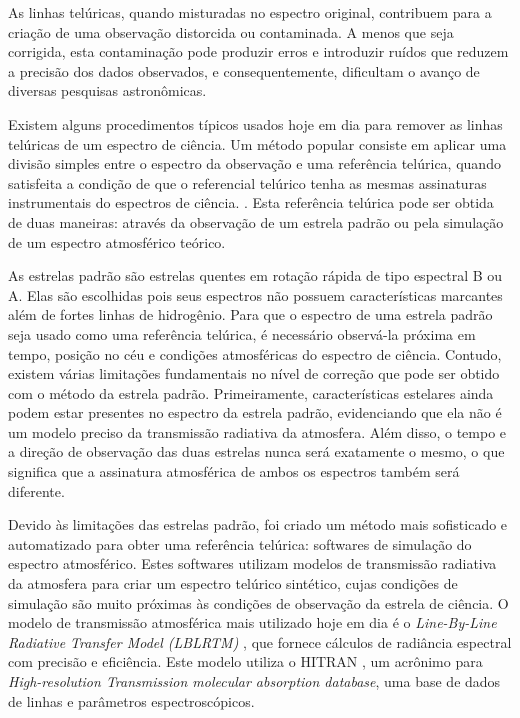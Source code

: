 As linhas telúricas, quando misturadas no espectro original, contribuem para a criação de uma observação distorcida ou contaminada. A menos que seja corrigida, esta contaminação pode produzir erros e introduzir ruídos que reduzem a precisão dos dados observados, e consequentemente, dificultam o avanço de diversas pesquisas astronômicas.

Existem alguns procedimentos típicos usados hoje em dia para remover as linhas telúricas de um espectro de ciência. Um método popular consiste em aplicar uma divisão simples entre o espectro da observação e uma referência telúrica, quando satisfeita a condição de que o referencial telúrico tenha as mesmas assinaturas instrumentais do espectros de ciência. . Esta referência telúrica pode ser obtida de duas maneiras: através da observação de um estrela padrão ou pela simulação de um espectro atmosférico teórico.

As estrelas padrão são estrelas quentes em rotação rápida de tipo espectral B ou A. Elas são escolhidas pois seus espectros não possuem características marcantes além de fortes linhas de hidrogênio. Para que o espectro de uma estrela padrão seja usado como uma referência telúrica, é necessário observá-la próxima em tempo, posição no céu e condições atmosféricas do espectro de ciência. Contudo, existem várias limitações fundamentais no nível de correção que pode ser obtido com o método da estrela padrão. Primeiramente, características estelares ainda podem estar presentes no espectro da estrela padrão, evidenciando que ela não é um modelo preciso da transmissão radiativa da atmosfera. Além disso, o tempo e a direção de observação das duas estrelas nunca será exatamente o mesmo, o que significa que a assinatura atmosférica de ambos os espectros também será diferente.

Devido às limitações das estrelas padrão, foi criado um método mais sofisticado e automatizado para obter uma referência telúrica: softwares de simulação do espectro atmosférico. Estes softwares utilizam modelos de transmissão radiativa da atmosfera para criar um espectro telúrico sintético, cujas condições de simulação são muito próximas às condições de observação da estrela de ciência. O modelo de transmissão atmosférica mais utilizado hoje em dia é o \textit{Line-By-Line Radiative Transfer Model (LBLRTM)} \citep{2005JQSRT..91..233C}, que fornece cálculos de radiância espectral com precisão e eficiência. Este modelo utiliza o HITRAN \citep{rothman2009hitran}, um acrônimo para \textit{High-resolution Transmission molecular absorption database}, uma base de dados de linhas e parâmetros espectroscópicos. 

